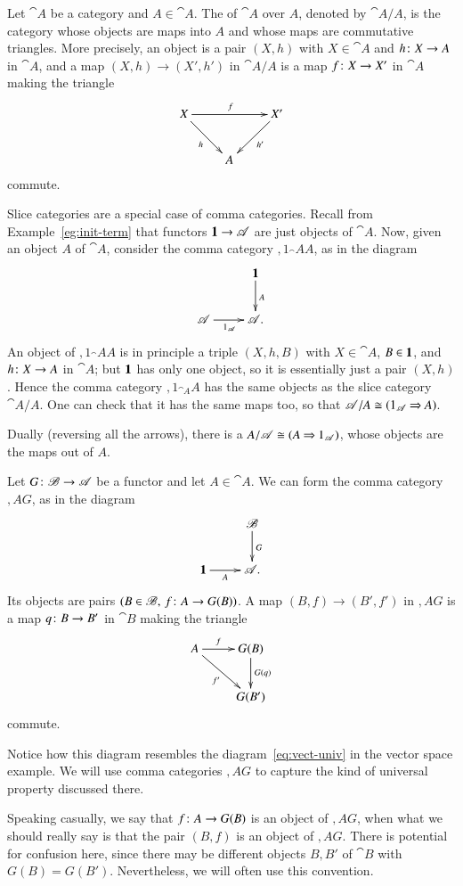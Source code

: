 \begin{example}
Let $\cat{A}$ be a category and $A \in \cat{A}$.  The  of $\cat{A}$ over $A$, denoted by $\cat{A}/A$,%
%
%
is the category whose objects are maps into $A$ and whose maps are
commutative triangles.  More precisely, an object is a pair $(X, h)$ with
$X \in \cat{A}$ and $h\from X \to A$ in $\cat{A}$, and a map $(X, h) \to
(X', h')$ in $\cat{A}/A$ is a map $f\from X \to X'$ in $\cat{A}$ making the
triangle
\[
\xymatrix{
X \ar[rr]^f \ar[rd]_h   &       &X' \ar[ld]^{h'}     \\
                        &A
}
\]
commute.  

Slice categories are a special case of comma categories.  Recall from
Example~\ref{eg:init-term} that functors $\mathbf{1} \to \mathscr{A}$ are just
objects of $\cat{A}$.  Now, given an object $A$ of $\cat{A}$, consider the
comma category $\comma{1_\cat{A}}{A}$, as in the diagram
\[
\xymatrix{
        &\One \ar[d]^A       \\
\cat{A} \ar[r]_{1_\cat{A}}      &
\cat{A}.
}
\]
An object of $\comma{1_\cat{A}}{A}$ is in principle a triple $(X, h, B)$
with $X \in \cat{A}$, $B \in \mathbf{1}$, and $h\from X \to A$ in $\cat{A}$; but
$\mathbf{1}$ has only one object, so it is essentially just a pair $(X, h)$.
Hence the comma category $\comma{1_{\cat{A}}}{A}$ has the same objects as
the slice category $\cat{A}/A$.  One can check that it has the same maps
too, so that $\mathscr{A}/A \cong (1_{\mathscr{A}} \mathbin{\Rightarrow} A)$.

Dually (reversing all the arrows), there is a  $A/\mathscr{A} \cong (A \mathbin{\Rightarrow} 1_{\mathscr{A}})$,%
%
%
 whose objects are the maps out of
$A$.  
\end{example}

\begin{example}
\label{eg:comma-obj-ftr}
Let $G\from \cat{B} \to \cat{A}$ be a functor and let $A \in \cat{A}$.  We
can form the comma category $\comma{A}{G}$,%
%
%
 as in the diagram
\[
\xymatrix{
        &\cat{B} \ar[d]^G       \\
\One \ar[r]_-A           &
\cat{A}.
}
\]
Its objects are pairs $(B \in \cat{B},\, f\from A \to G(B))$.  A map $(B,
f) \to (B', f')$ in $\comma{A}{G}$ is a map $q\from B \to B'$ in $\cat{B}$
making the triangle
\[
\xymatrix{
A \ar[r]^-f \ar[rd]_{f'}         &G(B) \ar[d]^{G(q)}     \\
                                &G(B')
}
\]
commute.  

Notice how this diagram resembles the diagram~\eqref{eq:vect-univ} in the
vector space example.  We will use comma categories $\comma{A}{G}$ to
capture the kind of universal property discussed there.

Speaking casually, we say that $f\from A \to G(B)$ is an object of
$\comma{A}{G}$, when what we should really say is that the pair $(B, f)$ is
an object of $\comma{A}{G}$.  There is potential for confusion here, since
there may be different objects $B, B'$ of $\cat{B}$ with $G(B) = G(B')$.
Nevertheless, we will often use this convention.
\end{example}

